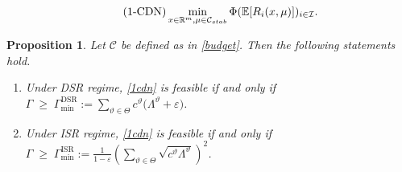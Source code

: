 \documentclass[10pt,a4paper]{amsart}
\newtheorem{proposition}{Proposition}
\newcommand{\E}{\mathbb{E}}
\newcommand{\I}{\mathcal{I}}
\newcommand{\R}{\mathbb{R}}
\begin{document}
\begin{equation}\label{1cdn}\tag{1-CDN}
    \min_{x\in\R^m, \mu\in \mathcal{C}_{\rm stab}} \Phi(\E[R_i(x,\mu)])_{i\in\I}.
\end{equation}

\begin{proposition}\label{prop:budget_feasibility}
Let $\mathcal C$ be defined as in \eqref{budget}. Then the following statements hold.

\begin{enumerate}[label=\roman*), ref=\roman*]
\item Under {\rm DSR} regime, \eqref{1cdn} is feasible if and only if $
\Gamma \;\ge\;
\Gamma_{\min}^{\mathrm{DSR}}
:=
\sum_{\vartheta\in \Theta} c^\vartheta \big(\Lambda^\vartheta+\varepsilon\big)$.

\item Under {\rm ISR} regime, \eqref{1cdn} is feasible if and only if $
\Gamma \;\ge\;
\Gamma_{\min}^{\mathrm{ISR}}
:= \frac{1}{1-\varepsilon} \left(\sum_{\vartheta\in \Theta} \sqrt{c^\vartheta \Lambda^\vartheta}\right)^2$.
\end{enumerate}
\end{proposition}
\end{document}
